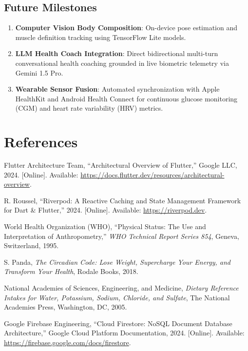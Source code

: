 \documentclass[12pt,a4paper]{article}
\begin{document}
\subsection{Future Milestones}
\begin{enumerate}[leftmargin=1.5em]
    \item \textbf{Computer Vision Body Composition}: On-device pose estimation and muscle definition tracking using TensorFlow Lite models.
    \item \textbf{LLM Health Coach Integration}: Direct bidirectional multi-turn conversational health coaching grounded in live biometric telemetry via Gemini 1.5 Pro.
    \item \textbf{Wearable Sensor Fusion}: Automated synchronization with Apple HealthKit and Android Health Connect for continuous glucose monitoring (CGM) and heart rate variability (HRV) metrics.
\end{enumerate}

\clearpage
\section*{References}
\begin{enumerate}[label={[\arabic*]}, leftmargin=2em]
    \item Flutter Architecture Team, ``Architectural Overview of Flutter,'' Google LLC, 2024. [Online]. Available: \url{https://docs.flutter.dev/resources/architectural-overview}.
    \item R. Roussel, ``Riverpod: A Reactive Caching and State Management Framework for Dart \& Flutter,'' 2024. [Online]. Available: \url{https://riverpod.dev}.
    \item World Health Organization (WHO), ``Physical Status: The Use and Interpretation of Anthropometry,'' \textit{WHO Technical Report Series 854}, Geneva, Switzerland, 1995.
    \item S. Panda, \textit{The Circadian Code: Lose Weight, Supercharge Your Energy, and Transform Your Health}, Rodale Books, 2018.
    \item National Academies of Sciences, Engineering, and Medicine, \textit{Dietary Reference Intakes for Water, Potassium, Sodium, Chloride, and Sulfate}, The National Academies Press, Washington, DC, 2005.
    \item Google Firebase Engineering, ``Cloud Firestore: NoSQL Document Database Architecture,'' Google Cloud Platform Documentation, 2024. [Online]. Available: \url{https://firebase.google.com/docs/firestore}.
\end{enumerate}
\end{document}
